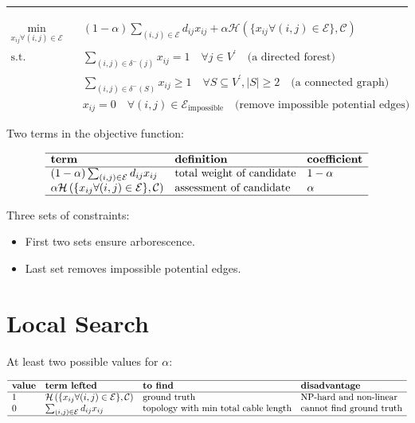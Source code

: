 \documentclass[
]{book}
\providecommand{\tightlist}{%
  \setlength{\itemsep}{0pt}\setlength{\parskip}{0pt}}
\begin{document}
\begin{center}\rule{0.5\linewidth}{0.5pt}\end{center}

\[
\begin{aligned}
  \min_{x_{i j} \forall (i, j) \in \mathcal{E}} \quad
    & (1 - \alpha) \sum_{(i, j) \in \mathcal{E}} d_{i j} x_{i j}
    + \alpha \mathcal{H}
    \left(\{x_{i j} \forall (i, j) \in \mathcal{E} \}, \mathcal{C} \right) \\
  \text{s.t.} \quad & \sum_{(i, j) \in \delta^{-}(j)} x_{i j} = 1
    \quad \forall j \in V^{\prime}
    \quad \text{(a directed forest)} \\
  & \sum_{(i, j) \in \delta^{-}(S)} x_{i j} \geq 1
    \quad \forall S \subseteq V^{\prime},|S| \geq 2
    \quad \text{(a connected graph)} \\
  & x_{i j} = 0
    \quad \forall (i, j) \in \mathcal{E}_\text{impossible}
    \quad \text{(remove impossible potential edges)}
\end{aligned}
\]

Two terms in the objective function:

\[
\begin{array}{lll}
  \hline
  \textbf{term} & \textbf{definition} & \textbf{coefficient} \\
  \hline
  (1 - \alpha) \sum_{(i, j) \in \mathcal{E}} d_{i j} x_{i j}
  & \text{total weight of candidate}
  & 1 - \alpha \\
  \alpha \mathcal{H}
  \left(\{x_{i j} \forall (i, j) \in \mathcal{E} \}, \mathcal{C} \right)
  & \text{assessment of candidate}
  & \alpha \\
  \hline
\end{array}
\]

Three sets of constraints:

\begin{itemize}
\tightlist
\item
  First two sets ensure arborescence. \citep{fischetti1997branch}
\item
  Last set removes impossible potential edges.
\end{itemize}

\hypertarget{combinatorial}{%
\section{Local Search}\label{combinatorial}}

At least two possible values for \(\alpha\):

\[
\begin{array}{llll}
  \hline
  \textbf{value} & \textbf{term lefted} & \textbf{to find}
  & \textbf{disadvantage} \\
  \hline
  1
  & \mathcal{H}
  \left(\{x_{i j} \forall (i, j) \in \mathcal{E} \}, \mathcal{C} \right)
  & \text{ground truth}
  & \text{NP-hard and non-linear} \\
  0
  & \sum_{(i, j) \in \mathcal{E}} d_{i j} x_{i j}
  & \text{topology with min total cable length}
  & \text{cannot find ground truth} \\
  \hline
\end{array}
\]
\end{document}

